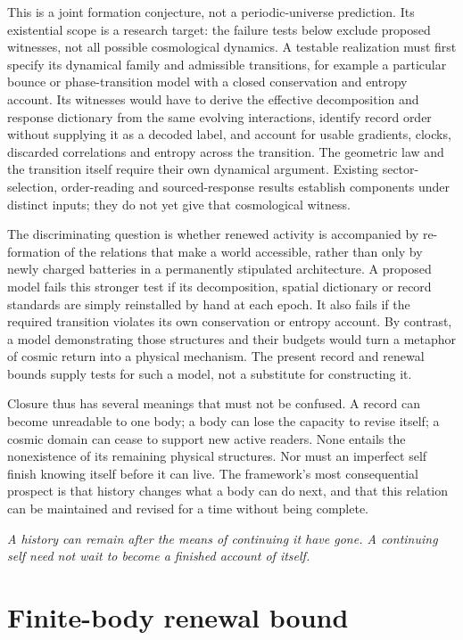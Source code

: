 \documentclass[12pt,a4paper]{article}
\begin{document}
This is a joint formation conjecture, not a periodic-universe prediction.
Its existential scope is a research target: the failure tests below
exclude proposed witnesses, not all possible cosmological dynamics.
A testable realization must first specify its dynamical family and
admissible transitions, for example a particular bounce or phase-transition
model with a closed conservation and entropy account.
Its witnesses would have to derive the effective decomposition and
response dictionary from the same evolving interactions, identify
record order without supplying it as a decoded label, and account for
usable gradients, clocks, discarded correlations and entropy across
the transition. The geometric law and the transition itself require
their own dynamical argument. Existing sector-selection, order-reading
and sourced-response results establish components under distinct
inputs; they do not yet give that cosmological witness.

The discriminating question is whether renewed activity is accompanied
by re-formation of the relations that make a world accessible, rather
than only by newly charged batteries in a permanently stipulated
architecture. A proposed model fails this stronger test if its
decomposition, spatial dictionary or record standards are simply
reinstalled by hand at each epoch. It also fails if the required
transition violates its own conservation or entropy account. By
contrast, a model demonstrating those structures and their budgets
would turn a metaphor of cosmic return into a physical mechanism.
The present record and renewal bounds supply tests for such a model,
not a substitute for constructing it.

Closure thus has several meanings that must not be confused. A record can become unreadable to one body; a body can lose the capacity to revise itself; a cosmic domain can cease to support new active readers. None entails the nonexistence of its remaining physical structures. Nor must an imperfect self finish knowing itself before it can live. The framework's most consequential prospect is that history changes what a body can do next, and that this relation can be maintained and revised for a time without being complete.

\bigskip
\noindent\textit{A history can remain after the means of continuing it have gone. A continuing self need not wait to become a finished account of itself.}

\appendix
\section{Finite-body renewal bound}
\end{document}
